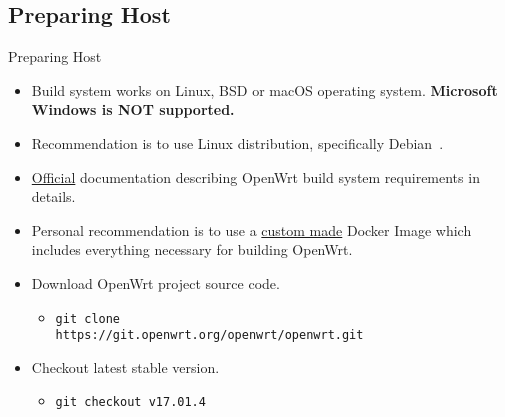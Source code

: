 \subsection{Preparing Host}
\begin{frame}{Preparing Host}
    \pause
    \begin{itemize}[<+-|alert@+>]
        \item Build system works on Linux, BSD or macOS operating system. \textbf{Microsoft Windows is NOT supported.}
        \item Recommendation is to use Linux distribution, specifically Debian~\cite{debian-website}.
        \item \href{https://openwrt.org/docs/guide-developer/build-system/install-buildsystem}{Official} documentation describing OpenWrt build system requirements in details.
        \item Personal recommendation is to use a \href{https://github.com/hvarga/openwrt-application-development/blob/master/presentation/resources/Dockerfile}{custom made} Docker Image which includes everything necessary for building OpenWrt.
        \item Download OpenWrt project source code.
        \begin{itemize}
            \item \texttt{git clone} \\
                  \texttt{https://git.openwrt.org/openwrt/openwrt.git}
        \end{itemize}
        \item Checkout latest stable version.
        \begin{itemize}
            \item \texttt{git checkout v17.01.4}
        \end{itemize}
    \end{itemize}
\end{frame}

